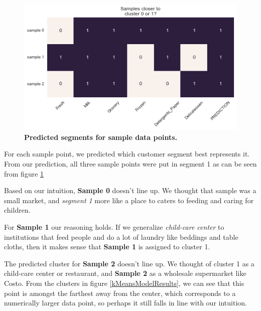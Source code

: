 \documentclass[twoside,openright,titlepage,numbers=noenddot,headinclude,%
               footinclude=true,cleardoublepage=empty,abstractoff,BCOR=5mm,%
               paper=a4,fontsize=11pt,ngerman,american]{scrreprt}
\numberwithin{theorem}{chapter}
\numberwithin{definition}{chapter}
\numberwithin{algorithm}{chapter}
\numberwithin{figure}{chapter}
\numberwithin{table}{chapter}
\numberwithin{equation}{chapter}
\begin{document}
\begin{figure}[!hbtp]
\centering
    
    \includegraphics[width=1\textwidth]{figures/samplePointSegment}
    
    \caption{\textbf{Predicted segments for sample data points.}}\label{samplePointSegment}
\end{figure}

For each sample point, we predicted which customer segment best represents it. From our prediction, all three sample points were put in segment 1 as can be seen from figure \ref{samplePointSegment} 

Based on our intuition, \textbf{Sample 0} doesn't line up. We thought that sample was a small market, and \emph{segment 1} more like a place to caters to feeding and caring for children.

For \textbf{Sample 1} our reasoning holds. If we generalize \emph{child-care center} to institutions that feed people and do a lot of laundry like beddings and table cloths, then it makes sense that \textbf{Sample 1} is assigned to cluster 1.

The predicted cluster for \textbf{Sample 2} doesn't line up. We thought of cluster 1 as a child-care center or restaurant, and \textbf{Sample 2} as a wholesale supermarket like Costo. From the clusters in figure \ref{kMeansModelResults}, we can see that this point is amongst the farthest away from the center, which corresponds to a numerically larger data point, so perhaps it still falls in line with our intuition.
\end{document}
